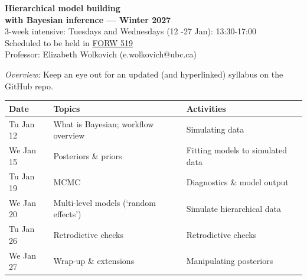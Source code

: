 \documentclass[11pt]{article}
\renewcommand{\baselinestretch}{1.20}
\begin{document}
 
\begin{center} {\large \textbf{Hierarchical model building \\ with Bayesian inference --- Winter 2027}}\\ [10pt] %
3-week intensive: Tuesdays and Wednesdays (12 -27 Jan): 13:30-17:00 \\ %
Scheduled to be held in \href{https://learningspaces.ubc.ca/classrooms/forw-519}{FORW 519} \\
Professor: Elizabeth Wolkovich (e.wolkovich@ubc.ca) \\
\end{center} 
\emph{Overview:} Keep an eye out for an updated (and hyperlinked) syllabus on the GitHub repo. 
\renewcommand{\baselinestretch}{1.10}
\begin{center}
\begin{tabular}{p{2cm} p{6.5cm}  p{5.5cm}  }
   \textbf{Date}
   & \textbf{Topics}
      & \textbf{Activities} \\ 
\hline \hline
Tu Jan 12  & What is Bayesian; workflow overview  & Simulating data     \\ 
We Jan 15  & Posteriors \& priors &  Fitting models to simulated data       \\ %
Tu Jan 19  & MCMC & Diagnostics \& model output             \\ %
We Jan 20  & Multi-level models (`random effects')  &  Simulate hierarchical data    \\  %
Tu Jan 26  & Retrodictive checks &  Retrodictive checks   \\ %
We Jan 27  & Wrap-up \& extensions  &  Manipulating posteriors       \\ 

\hline
\end{tabular}
\end{center}
\vspace{4pt}
\end{document}
